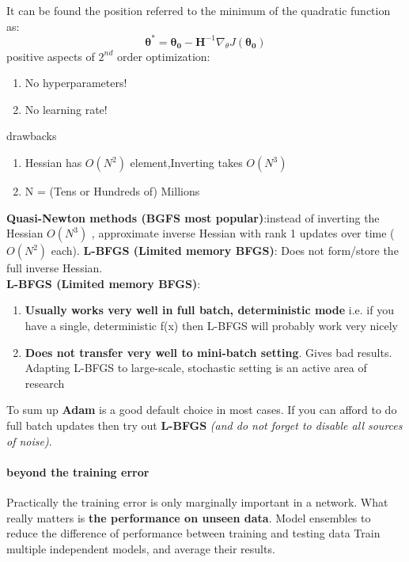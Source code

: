 \documentclass[11pt]{article}
\begin{document}
It can be found the position referred to the minimum of the quadratic function as:
\begin{equation}
 \boldsymbol{\theta^*}= \boldsymbol{\theta_0}- \mathbf{H}^{-1} \nabla_{\theta} J(\boldsymbol{\theta_0}) 
\end{equation}{}
positive aspects of $2^{nd}$ order optimization:
\begin{enumerate}
    \item No hyperparameters!
    \item No learning rate!
\end{enumerate}{}
drawbacks
\begin{enumerate}
    \item Hessian has $O(N^2)$ element,Inverting takes $O(N^3)$
    \item N = (Tens or Hundreds of) Millions
\end{enumerate}{}
\textbf{Quasi-Newton methods (BGFS most popular)}:instead of inverting the Hessian $O(N^3)$ , approximate inverse Hessian with rank 1 updates over time ($O(N^2)$  each).
\textbf{L-BFGS (Limited memory BFGS)}: Does not form/store the full inverse Hessian.\\
\textbf{L-BFGS (Limited memory BFGS)}:
\begin{enumerate}
    \item \textbf{Usually works very well in full batch, deterministic mode} i.e. if you have a single, deterministic f(x) then L-BFGS will probably work very nicely
    \item \textbf{Does not transfer very well to mini-batch setting}. Gives bad results. Adapting L-BFGS to large-scale, stochastic setting is an active area of research
\end{enumerate}{}

To sum up \textbf{Adam }is a good default choice in most cases. If you can afford to do full batch updates then try out \textbf{ L-BFGS} \textit{ (and do not forget to disable all sources of noise)}.
\clearpage
\paragraph{beyond the training error}
Practically the training error is only marginally important in a network. What really matters is \textbf{ the performance on unseen data}.
Model ensembles to reduce the difference of performance between training and testing data
Train multiple independent models, and average their results.
\end{document}
